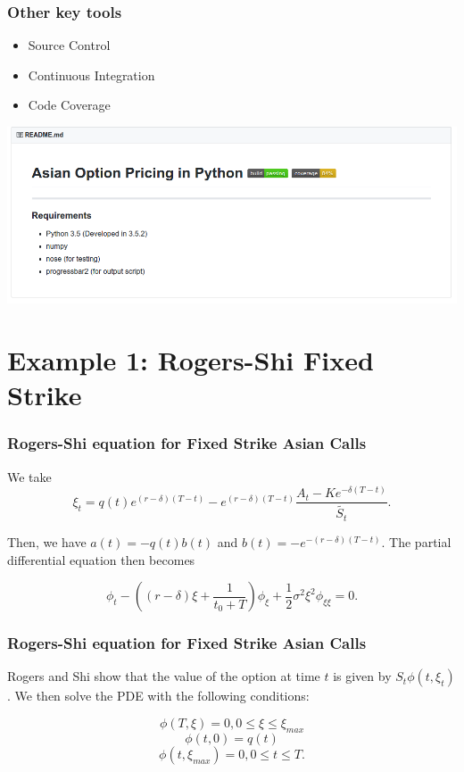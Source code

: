 \documentclass{beamer}
\begin{document}
  \begin{frame}
    \frametitle{Other key tools}
    \begin{itemize}
      \item Source Control
      \item Continuous Integration
      \item Code Coverage
    \end{itemize}
    \includegraphics[width=\textwidth]{coverage}
  \end{frame}

  \section{Example 1: Rogers-Shi Fixed Strike}

  \begin{frame}
    \frametitle{Rogers-Shi equation for Fixed Strike Asian Calls}
    We take
    \begin{equation}
      \xi_t = q(t)e^{(r-\delta)(T-t)} - e^{(r-\delta)(T-t)}\frac{A_t - Ke^{-\delta(T-t)}}{\tilde{S_t}}.
    \end{equation}

    Then, we have \( a(t) = -q(t)b(t) \) and \(b(t) = -e^{-(r-\delta)(T-t)}\). The partial differential equation then becomes

    \begin{equation}
      \phi_t - ( (r-\delta)\xi + \frac{1}{t_0 + T} ) \phi_\xi + \frac{1}{2}\sigma^2\xi^2\phi_{\xi\xi} = 0.
    \end{equation}
  \end{frame}

  \begin{frame}
    \frametitle{Rogers-Shi equation for Fixed Strike Asian Calls}
    Rogers and Shi show that the value of the option at time \(t\) is given by \(S_t\phi(t, \xi_t)\). We then solve the PDE with the following conditions:

    \begin{equation}
      \phi(T, \xi) = 0, 0 \le \xi \le \xi_{max}
    \end{equation}
    \begin{equation}
      \phi(t, 0) = q(t)
    \end{equation}
    \begin{equation}
      \phi(t, \xi_{max}) = 0, 0 \le t \le T.
    \end{equation}
  \end{frame}
\end{document}
